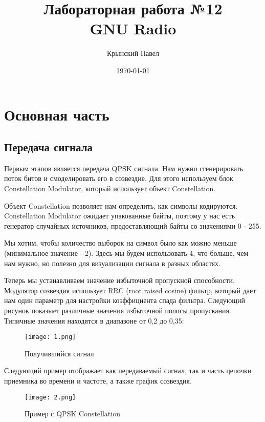 \documentclass[a4paper,12pt]{report}
\title{Лабораторная работа №12\\GNU Radio}
\author{Крынский Павел}
\date{\today}
\begin{document}
\maketitle
\tableofcontents
\listoffigures

\maketitle

\chapter{Основная часть}
\section{Передача сигнала}
 
 
Первым этапов является передача QPSK сигнала. Нам нужно сгенерировать поток битов и смоделировать его в созвездие. Для этого используем блок Constellation Modulator, который использует объект Constellation. 

Объект Constellation позволяет нам определить, как символы кодируются. Constellation Modulator ожидает упакованные байты, поэтому у нас есть генератор случайных источников, предоставляющий байты со значениями 0 - 255. 

Мы хотим, чтобы количество выборок на символ было как можно меньше (минимальное значение - 2). Здесь мы будем использовать 4, что больше, чем нам нужно, но полезно для визуализации сигнала в разных областях. 

Теперь мы устанавливаем значение избыточной пропускной способности. Модулятор созвездия использует RRC (root raised cosine) фильтр, который дает нам один параметр для настройки коэффициента спада фильтра. Следующий рисунок показыeт различные значения избыточной полосы пропускания. Типичные значения находятся в диапазоне от 0,2 до 0,35: 

\begin{figure}[H]
        \centering
        \texttt{[image: 1.png]}
        \caption{Получившийся сигнал}
        \label{fig:ig4_1}
\end{figure}

Следующий пример отображает как передаваемый сигнал, так и часть цепочки приемника во времени и частоте, а также график созвездия.

\begin{figure}[H]
        \centering
        \texttt{[image: 2.png]}
        \caption{Пример с QPSK Constellation}
        \label{fig:ig4_1}
\end{figure}
\end{document}
